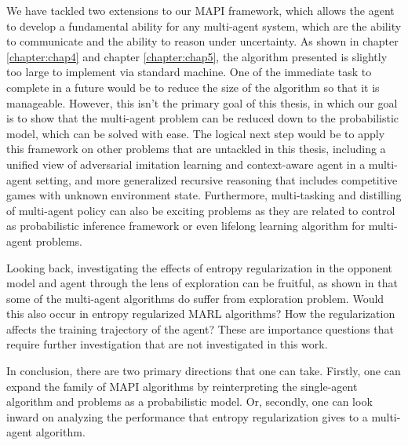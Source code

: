 \label{sec:chap6-future-work}

We have tackled two extensions to our MAPI framework, which allows the agent to develop a fundamental ability for any multi-agent system, which are the ability to communicate and the ability to reason under uncertainty. As shown in chapter \ref{chapter:chap4} and chapter \ref{chapter:chap5}, the algorithm presented is slightly too large to implement via standard machine. One of the immediate task to complete in a future would be to reduce the size of the algorithm so that it is manageable. However, this isn't the primary goal of this thesis, in which our goal is to show that the multi-agent problem can be reduced down to the probabilistic model, which can be solved with ease. The logical next step would be to apply this framework on other problems that are untackled in this thesis, including a unified view of adversarial imitation learning and context-aware agent in a multi-agent setting, and more generalized recursive reasoning that includes competitive games with unknown environment state. Furthermore, multi-tasking and distilling of multi-agent policy can also be exciting problems as they are related to control as probabilistic inference framework or even lifelong learning algorithm for multi-agent problems.

Looking back, investigating the effects of entropy regularization in the opponent model and agent through the lens of exploration can be fruitful, as shown in \cite{mahajan2019maven} that some of the multi-agent algorithms do suffer from exploration problem. Would this also occur in entropy regularized MARL algorithms? How the regularization affects the training trajectory of the agent? These are importance questions that require further investigation that are not investigated in this work.

In conclusion, there are two primary directions that one can take. Firstly, one can expand the family of MAPI algorithms by reinterpreting the single-agent algorithm and problems as a probabilistic model. Or, secondly, one can look inward on analyzing the performance that entropy regularization gives to a multi-agent algorithm. 
